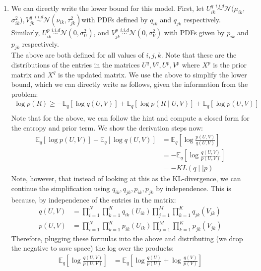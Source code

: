 \documentclass{harvardml}
\newcommand{\E}{\mathbb{E}}
\newcommand{\N}{\mathcal{N}}
\theoremstyle{plain}
\begin{document}
\begin{enumerate}

\item We can directly write the lower bound for this model. First, let $U^q_{ik} \stackrel{i.i.d}{\sim} \N(\mu_{ik}$, $\sigma_{ik}^2), V^q_{jk} \stackrel{i.i.d}{\sim} \N(\nu_{ik}, \tau_{jk}^2)$with PDFs defined by $q_{ik}$ and $q_{jk}$ respectively.\\

Similarly, $U^p_{ik} \stackrel{i.i.d}{\sim} \N(0, \sigma_U^2)$, and $V^p_{jk} \stackrel{i.i.d}{\sim} \N(0, \sigma_V^2)$ with PDFs given by $p_{ik}$ and $p_{jk}$ respectively. \\

The above are both defined for all values of $i,j,k$. Note that these are the distributions of the entries in the matrices $U^q, V^q, U^p, V^p$ where $X^p$ is the prior matrix and $X^q$ is the updated matrix. We use the above to simplify the lower bound, which we can directly write as follows, given the information from the problem:
\begin{align*}
\log p(R) \geq - \E_q[\log q(U,V) ] + \E_q [\log p(R \mid U,V)] + \E_q[\log p(U,V)] \\
\end{align*}
Note that for the above, we can follow the hint and compute a closed form for the entropy and prior term. We show the derivation steps now:
\begin{align*}
\E_q[\log p(U,V)] - \E_q[\log q(U,V)] &= \E_q\left [ \log \frac{p(U,V)}{q(U,V)} \right] \\
&= -\E_q\left[\log \frac{q(U,V)}{p(U,V)} \right]\\
&= -KL(q \mid\mid p)
\end{align*}
Note, however, that instead of looking at this as the KL-divergence, we can continue the simplification using $q_{ik}, q_{jk}, p_{ik}, p_{jk}$ by independence. This is because, by independence of the entries in the matrix:
\begin{align*}
q(U,V) &= \prod_{i=1}^N\prod_{k=1}^K q_{ik}(U_{ik}) \prod_{j=1}^M\prod_{k=1}^K q_{jk}(V_{jk}) \\
p(U,V) &=  \prod_{i=1}^N\prod_{k=1}^K p_{ik}(U_{ik}) \prod_{j=1}^M\prod_{k=1}^K p_{jk}(V_{jk})
\end{align*}
Therefore, plugging these formulas into the above and distributing (we drop the negative to save space) the log over the products:
\begin{align*}
\E_q\left[\log \frac{q(U,V)}{p(U,V)}\right] &= \E_q\left[\log\frac{q(U)}{p(U)} + \log \frac{q(V)}{p(V)} \right]  \\

\end{align*}
\end{enumerate}
\end{document}
